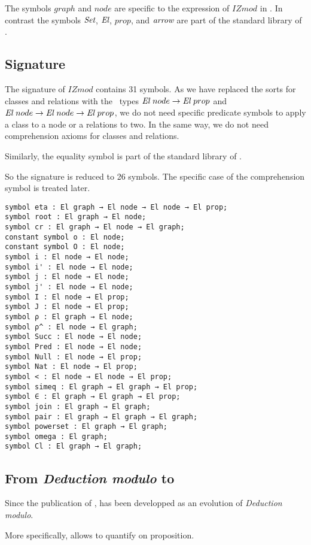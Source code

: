 \documentclass[a4paper]{article}
\begin{document}
The symbols $graph$ and $node$ are specific to the
expression of $IZmod$ in \dedukti. In contrast the symbols $\mbox{\it Set}$,
${\mbox{\it El}}$, $prop$, and ${\mbox{\it arrow}}$ are part of the standard library of 
\dedukti.

\subsection{Signature}

The signature of $IZmod$ contains 31 symbols. As we have replaced the
sorts for classes and relations with the \dedukti \ types
${\mbox{\it El}}~node \rightarrow {\mbox{\it El}}~prop$ and ${\mbox{\it El}}~node \rightarrow {\mbox{\it El}}~node \rightarrow {\mbox{\it El}}~prop$, we do not need specific predicate symbols to apply a class to a node or a relations to two. In the same way, we do not need comprehension axioms for classes and relations. 

Similarly, the equality symbol is part of the standard library of \dedukti.

So the signature is reduced to 26 symbols. The specific case of the comprehension symbol is treated later.

\begin{lstlisting}
symbol eta : El graph → El node → El node → El prop;
symbol root : El graph → El node;
symbol cr : El graph → El node → El graph;
constant symbol o : El node;
constant symbol O : El node;
symbol i : El node → El node;
symbol i' : El node → El node;
symbol j : El node → El node;
symbol j' : El node → El node;
symbol I : El node → El prop;
symbol J : El node → El prop;
symbol ρ : El graph → El node;
symbol ρ^ : El node → El graph;
symbol Succ : El node → El node;
symbol Pred : El node → El node;
symbol Null : El node → El prop;
symbol Nat : El node → El prop;
symbol < : El node → El node → El prop;
symbol simeq : El graph → El graph → El prop;
symbol ∈ : El graph → El graph → El prop;
symbol join : El graph → El graph;
symbol pair : El graph → El graph → El graph;
symbol powerset : El graph → El graph;
symbol omega : El graph;
symbol Cl : El graph → El graph;
\end{lstlisting}

\subsection{From \textit{Deduction modulo} to \lpcm}

Since the publication of \cite{zermodulo}, \lpcm has been developped as an evolution of \textit{Deduction modulo}.

More specifically, \lpcm allows to quantify on proposition.
\end{document}
